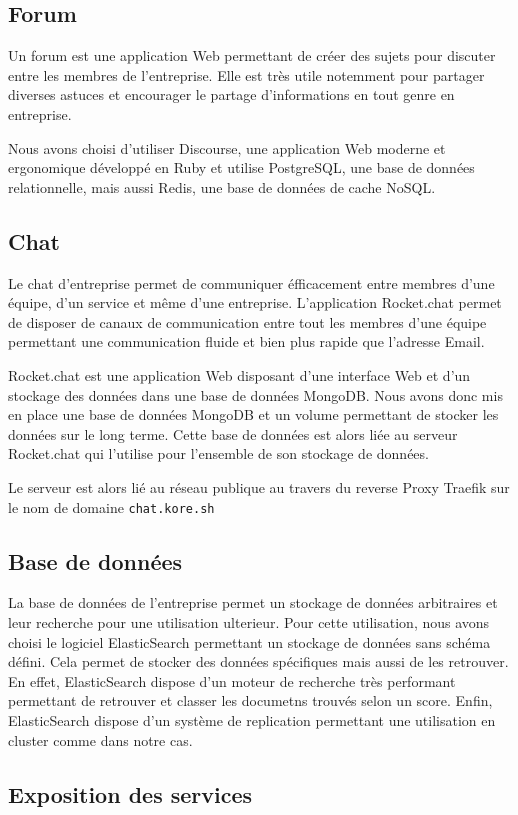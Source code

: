 \subsection{Forum}

Un forum est une application Web permettant de créer des sujets pour discuter entre les membres de l'entreprise.
Elle est très utile notemment pour partager diverses astuces et encourager le partage d'informations en tout genre en entreprise.

Nous avons choisi d'utiliser Discourse, une application Web moderne et ergonomique développé en Ruby et utilise PostgreSQL, une base de données relationnelle, mais aussi Redis, une base de données de cache NoSQL.

\subsection{Chat}

Le chat d'entreprise permet de communiquer éfficacement entre membres d'une équipe, d'un service et même d'une entreprise.
L'application Rocket.chat permet de disposer de canaux de communication entre tout les membres d'une équipe permettant une communication fluide et bien plus rapide que l'adresse Email.

Rocket.chat est une application Web disposant d'une interface Web et d'un stockage des données dans une base de données MongoDB.
Nous avons donc mis en place une base de données MongoDB et un volume permettant de stocker les données sur le long terme.
Cette base de données est alors liée au serveur Rocket.chat qui l'utilise pour l'ensemble de son stockage de données.

Le serveur est alors lié au réseau publique au travers du reverse Proxy Traefik sur le nom de domaine \texttt{chat.kore.sh}

\subsection{Base de données}

La base de données de l'entreprise permet un stockage de données arbitraires et leur recherche pour une utilisation ulterieur.
Pour cette utilisation, nous avons choisi le logiciel ElasticSearch permettant un stockage de données sans schéma défini.
Cela permet de stocker des données spécifiques mais aussi de les retrouver.
En effet, ElasticSearch dispose d'un moteur de recherche très performant permettant de retrouver et classer les documetns trouvés selon un score.
Enfin, ElasticSearch dispose d'un système de replication permettant une utilisation en cluster comme dans notre cas.

\subsection{Exposition des services}